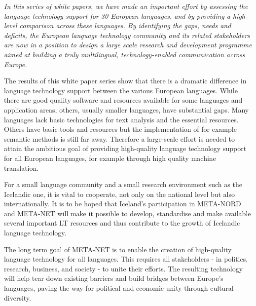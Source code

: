 \begin{multicols}{2}
\emph{In this series of white papers, we have made an important effort by assessing the language technology support for 30 European languages, and by providing a high-level comparison across these languages. By identifying the gaps, needs and deficits, the European language technology community and its related stakeholders are now in a position to design a large scale research and development programme aimed at building a truly multilingual, technology-enabled communication across Europe.}

The results of this white paper series show that there is a dramatic difference in language technology support between the various European languages. While there are good quality software and resources available for some languages and application areas, others, usually smaller languages, have substantial gaps. Many languages lack basic technologies for text analysis and the essential resources. Others have basic tools and resources but the implementation of for example semantic methods is still far away. Therefore a large-scale effort is needed to attain the ambitious goal of providing high-quality language technology support for all European languages, for example through high quality machine translation. 

For a small language community and a small research environment such as the Icelandic one, it is vital to cooperate, not only on the national level but also internationally. It is to be hoped that Iceland’s participation in META-NORD and META-NET will make it possible to develop, standardise and make available several important LT resources and thus contribute to the growth of Icelandic language technology.

The long term goal of META-NET is to enable the creation of high-quality language technology for all languages. This requires all stakeholders - in politics, research, business, and society - to unite their efforts. The resulting technology will help tear down existing barriers and build bridges between Europe’s languages, paving the way for political and economic unity through cultural diversity. 
\end{multicols}
\clearpage
